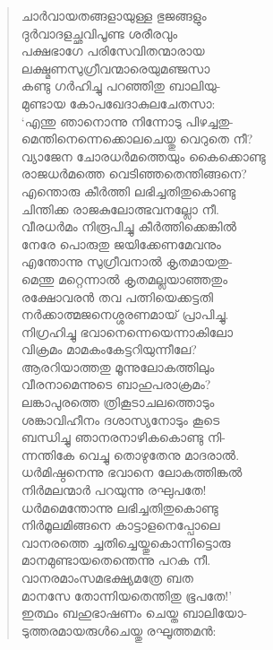 \begin{verse}
ചാര്‍വായതങ്ങളായുള്ള ഭുജങ്ങളും\\
ദുര്‍വാദളച്ഛവിപൂണ്ട ശരീരവും\\
പക്ഷഭാഗേ പരിസേവിതന്മാരായ\\
ലക്ഷ്മണസുഗ്രീവന്മാരെയുമഞ്ജസാ\\
കണ്ടു ഗര്‍ഹിച്ചു പറഞ്ഞിതു ബാലിയു-\\
മുണ്ടായ കോപഖേദാകുലചേതസാ:\\
‘എന്തു ഞാനൊന്നു നിന്നോടു പിഴച്ചതു-\\
മെന്തിനെന്നെക്കൊലചെയ്തു വെറുതെ നീ?\\
വ്യാജേന ചോരധര്‍മത്തെയും കൈക്കൊണ്ടു\\
രാജധര്‍മത്തെ വെടിഞ്ഞതെന്തിങ്ങനെ?\\
എന്തൊരു കീര്‍ത്തി ലഭിച്ചതിതുകൊണ്ടു\\
ചിന്തിക്ക രാജകുലോത്ഭവനല്ലോ നീ.\\
വീരധര്‍മം നിരൂപിച്ചു കീര്‍ത്തിക്കെങ്കില്‍\\
നേരേ പൊരുതു ജയിക്കേണമേവനും\\
എന്തോന്നു സുഗ്രീവനാല്‍ കൃതമായതു-\\
മെന്തു മറ്റെന്നാല്‍ കൃതമല്ലയാഞ്ഞതും\\
രക്ഷോവരന്‍ തവ പത്നിയെക്കട്ടതി\\
നര്‍ക്കാത്മജനെശ്ശരണമായ് പ്രാപിച്ചു.\\
നിഗ്രഹിച്ചു ഭവാനെന്നെയെന്നാകിലോ\\
വിക്രമം മാമകംകേട്ടറിയുന്നീലേ?\\
ആരറിയാത്തതു മൂന്നുലോകത്തിലും\\
വീരനാമെന്നുടെ ബാഹുപരാക്രമം?\\
ലങ്കാപുരത്തെ ത്രികൂടാചലത്തൊടും\\
ശങ്കാവിഹീനം ദശാസ്യനോടും കൂടെ\\
ബന്ധിച്ചു ഞാനരനാഴികകൊണ്ടു നി-\\
ന്നന്തികേ വെച്ചു തൊഴുതേനു മാദരാല്‍.\\
ധര്‍മിഷ്ഠനെന്നു ഭവാനെ ലോകത്തിങ്കല്‍\\
നിര്‍മലന്മാര്‍ പറയുന്നു രഘുപതേ!\\
ധര്‍മമെന്തോന്നു ലഭിച്ചതിതുകൊണ്ടു\\
നിര്‍മൂലമിങ്ങനെ കാട്ടാളനെപ്പോലെ\\
വാനരത്തെ ച്ചതിച്ചെയ്തുകൊന്നിട്ടൊരു\\
മാനമുണ്ടായതെന്തെന്നു പറക നീ.\\
വാനരമാംസമഭക്ഷ്യമത്രേ ബത\\
മാനസേ തോന്നിയതെന്തിതു ഭൂപതേ!’\\
ഇത്ഥം ബഹുഭാഷണം ചെയ്ത ബാലിയോ-\\
ടുത്തരമായരുള്‍ചെയ്തു രഘൂത്തമന്‍:\\

\end{verse}
